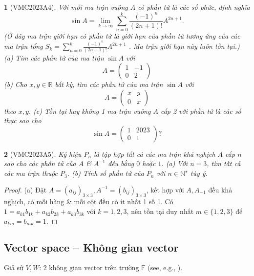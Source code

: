 \documentclass{article}
\newtheorem{baitoan}{}
\begin{document}
\begin{baitoan}[VMC2023A4]
	Với mỗi ma trận vuông $A$ có phần tử là các số phức, định nghĩa
	\begin{equation}
		\sin A = \lim_{k\to\infty} \sum_{n=0}^k \frac{(-1)^n}{(2n + 1)!}A^{2n + 1}.
	\end{equation}
	(Ở đây ma trận giới hạn có phần tử là giới hạn của phần tử tương ứng của các ma trận tổng $S_k = \sum_{n=0}^k \frac{(-1)^n}{(2n + 1)!}A^{2n + 1}$ . Ma trận giới hạn này luôn tồn tại.) (a) Tìm các phần tử của ma trận $\sin A$ với
	\begin{equation}
		A = \begin{pmatrix}
			1 & -1\\0 & 2
		\end{pmatrix}
	\end{equation}
	(b) Cho $x,y\in\mathbb{R}$ bất kỳ, tìm các phần tử của ma trận $\sin A$ với
	\begin{equation}
		A = \begin{pmatrix}
			x & y\\0 & x
		\end{pmatrix}
	\end{equation}
	theo $x,y$. (c) Tồn tại hay không 1 ma trận vuông $A$ cấp 2 với phần tử là các số thực sao cho
	\begin{equation}
		\sin A = \begin{pmatrix}
			1 & 2023\\0 & 1
		\end{pmatrix}?
	\end{equation}
\end{baitoan}

\begin{baitoan}[VMC2023A5]
	Ký hiệu $P_n$ là tập hợp tất cả các ma trận khả nghịch $A$ cấp $n$ sao cho các phần tử của $A$ \& $A^{-1}$ đều bằng $0$ hoặc $1$. (a) Với $n = 3$, tìm tất cả các ma trận thuộc $P_3$. (b) Tính số phần tử của $P_n$ với $n\in\mathbb{N}^\star$ tùy ý.
\end{baitoan}

\begin{proof}
	(a) Đặt $A = (a_{ij})_{3\times3},A^{-1} = (b_{ij})_{3\times3}$, kết hợp với $A,A_{-1}$ đều khả nghịch, có mỗi hàng \& mỗi cột đều có ít nhất 1 số 1. Có $1 = a_{k1}b_{1k} + a_{k2}b_{2k} + a_{k3}b_{3k}$ với $k = 1,2,3$, nên tồn tại duy nhất $m\in\{1,2,3\}$ để $a_{km} = b_{mk} = 1$.
\end{proof}

\subsection{Vector space -- Không gian vector}
Giả sử $V,W$: 2 không gian vector trên trường $\mathbb{F}$ (see, e.g., \cite[Chap. 2, \S2: Ánh xạ tuyến tính, pp. 100--110]{Hung_linear_algebra}).
\end{document}

